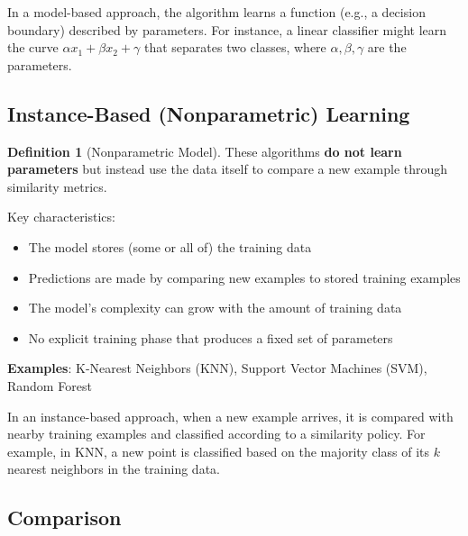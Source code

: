 \documentclass[11pt,a4paper]{article}
\theoremstyle{definition}
\newtheorem{definition}{Definition}[section]
\theoremstyle{plain}
\theoremstyle{remark}
\begin{document}
In a model-based approach, the algorithm learns a function (e.g., a decision boundary) described by parameters. For instance, a linear classifier might learn the curve $\alpha x_1 + \beta x_2 + \gamma$ that separates two classes, where $\alpha, \beta, \gamma$ are the parameters.

\subsection{Instance-Based (Nonparametric) Learning}

\begin{definition}[Nonparametric Model]
These algorithms \textbf{do not learn parameters} but instead use the data itself to compare a new example through similarity metrics.
\end{definition}

\begin{tcolorbox}[colback=teal!10!white,colframe=teal!75!black,title=\textbf{Nonparametric Model Characteristics}]
Key characteristics:
\begin{itemize}
    \item The model stores (some or all of) the training data
    \item Predictions are made by comparing new examples to stored training examples
    \item The model's complexity can grow with the amount of training data
    \item No explicit training phase that produces a fixed set of parameters
\end{itemize}

\textbf{Examples}: K-Nearest Neighbors (KNN), Support Vector Machines (SVM), Random Forest
\end{tcolorbox}

In an instance-based approach, when a new example arrives, it is compared with nearby training examples and classified according to a similarity policy. For example, in KNN, a new point is classified based on the majority class of its $k$ nearest neighbors in the training data.

\subsection{Comparison}
\end{document}
